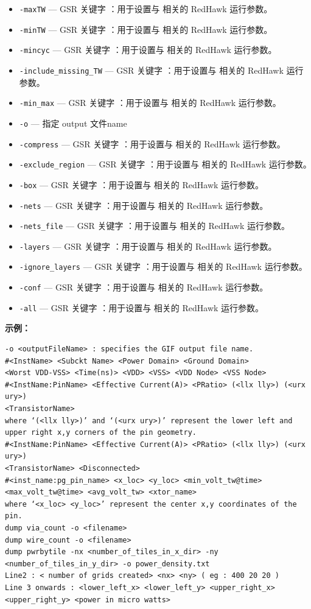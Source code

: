 \begin{itemize}
\item \texttt{-maxTW} — GSR 关键字 ：用于设置与  相关的 RedHawk 运行参数。
\item \texttt{-minTW} — GSR 关键字 ：用于设置与  相关的 RedHawk 运行参数。
\item \texttt{-mincyc} — GSR 关键字 ：用于设置与  相关的 RedHawk 运行参数。
\item \texttt{-include\_missing\_TW} — GSR 关键字 ：用于设置与  相关的 RedHawk 运行参数。
\item \texttt{-min\_max} — GSR 关键字 ：用于设置与  相关的 RedHawk 运行参数。
\item \texttt{-o} — 指定 output 文件name
\item \texttt{-compress} — GSR 关键字 ：用于设置与  相关的 RedHawk 运行参数。
\item \texttt{-exclude\_region} — GSR 关键字 ：用于设置与  相关的 RedHawk 运行参数。
\item \texttt{-box} — GSR 关键字 ：用于设置与  相关的 RedHawk 运行参数。
\item \texttt{-nets} — GSR 关键字 ：用于设置与  相关的 RedHawk 运行参数。
\item \texttt{-nets\_file} — GSR 关键字 ：用于设置与  相关的 RedHawk 运行参数。
\item \texttt{-layers} — GSR 关键字 ：用于设置与  相关的 RedHawk 运行参数。
\item \texttt{-ignore\_layers} — GSR 关键字 ：用于设置与  相关的 RedHawk 运行参数。
\item \texttt{-conf} — GSR 关键字 ：用于设置与  相关的 RedHawk 运行参数。
\item \texttt{-all} — GSR 关键字 ：用于设置与  相关的 RedHawk 运行参数。
\end{itemize}

\textbf{示例：}
\begin{lstlisting}
-o <outputFileName> : specifies the GIF output file name.
#<InstName> <Subckt Name> <Power Domain> <Ground Domain>
<Worst VDD-VSS> <Time(ns)> <VDD> <VSS> <VDD Node> <VSS Node>
#<InstName:PinName> <Effective Current(A)> <PRatio> (<llx lly>) (<urx ury>)
<TransistorName>
where ‘(<llx lly>)’ and ‘(<urx ury>)’ represent the lower left and upper right x,y corners of the pin geometry.
#<InstName:PinName> <Effective Current(A)> <PRatio> (<llx lly>) (<urx ury>)
<TransistorName> <Disconnected>
#<inst_name:pg_pin_name> <x_loc> <y_loc> <min_volt_tw@time>
<max_volt_tw@time> <avg_volt_tw> <xtor_name>
where ‘<x_loc> <y_loc>’ represent the center x,y coordinates of the pin.
dump via_count -o <filename>
dump wire_count -o <filename>
dump pwrbytile -nx <number_of_tiles_in_x_dir> -ny
<number_of_tiles_in_y_dir> -o power_density.txt
Line2 : < number of grids created> <nx> <ny> ( eg : 400 20 20 )
Line 3 onwards : <lower_left_x> <lower_left_y> <upper_right_x>
<upper_right_y> <power in micro watts>
\end{lstlisting}

